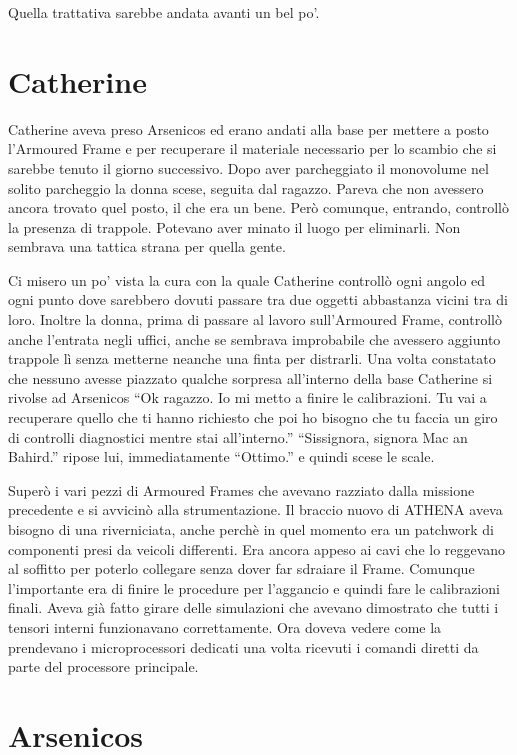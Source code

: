     Quella trattativa sarebbe andata avanti un bel po'.

  \section*{Catherine}

    Catherine aveva preso Arsenicos ed erano andati alla base per mettere a posto l'Armoured Frame e per recuperare il
    materiale necessario per lo scambio che si sarebbe tenuto il giorno successivo. Dopo aver parcheggiato il monovolume
    nel solito parcheggio la donna scese, seguita dal ragazzo. Pareva che non avessero ancora trovato quel posto, il che
    era un bene. Però comunque, entrando, controllò la presenza di trappole. Potevano aver minato il luogo per
    eliminarli. Non sembrava una tattica strana per quella gente.
    
    Ci misero un po' vista la cura con la quale Catherine controllò ogni angolo ed ogni punto dove sarebbero dovuti
    passare tra due oggetti abbastanza vicini tra di loro. Inoltre la donna, prima di passare al lavoro sull'Armoured
    Frame, controllò anche l'entrata negli uffici, anche se sembrava improbabile che avessero aggiunto trappole lì senza
    metterne neanche una finta per distrarli. Una volta constatato che nessuno avesse piazzato qualche sorpresa
    all'interno della base Catherine si rivolse ad Arsenicos ``Ok ragazzo. Io mi metto a finire le calibrazioni. Tu vai
    a recuperare quello che ti hanno richiesto che poi ho bisogno che tu faccia un giro di controlli diagnostici mentre
    stai all'interno.'' ``Sissignora, signora Mac an Bahird.'' ripose lui, immediatamente ``Ottimo.'' e quindi scese le
    scale.

    Superò i vari pezzi di Armoured Frames che avevano razziato dalla missione precedente e si avvicinò alla
    strumentazione. Il braccio nuovo di ATHENA aveva bisogno di una riverniciata, anche perchè in quel momento era un
    patchwork di componenti presi da veicoli differenti. Era ancora appeso ai cavi che lo reggevano al soffitto per
    poterlo collegare senza dover far sdraiare il Frame. Comunque l'importante era di finire le procedure per l'aggancio
    e quindi fare le calibrazioni finali. Aveva già fatto girare delle simulazioni che avevano dimostrato che tutti i
    tensori interni funzionavano correttamente. Ora doveva vedere come la prendevano i microprocessori dedicati una
    volta ricevuti i comandi diretti da parte del processore principale.

  \section*{Arsenicos}

